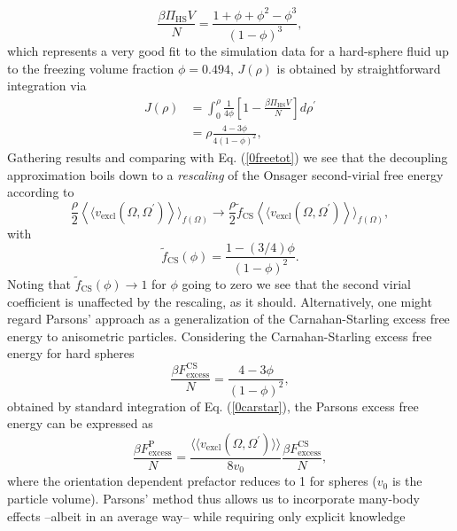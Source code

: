 \documentclass[amssymb]{revtex4}
\begin{document}
\begin{equation}
\frac{\beta \Pi_{\text{HS}} V}{N}=\frac{1+\phi+\phi^{2}-\phi^{3}}{(1-\phi)^{3}},
\label{0carstar}
\end{equation}
which represents a very good fit to the simulation data
for a hard-sphere fluid up to the freezing volume fraction $\phi=0.494$,
$J(\rho)$ is obtained by straightforward integration via
\begin{align}
J(\rho)&=\int_{0}^{\rho}\frac{1}{4\phi}\left[1-\frac{\beta \Pi_{\text{HS}}V}{N}\right]d\rho^{\prime} \nonumber \\
&=\rho \frac{4-3\phi}{4(1-\phi)^{2}},  
\end{align}
Gathering results and comparing with Eq. (\ref{0freetot}) we see that the decoupling approximation 
boils down to a {\em rescaling} of
the Onsager second-virial free energy according to 
\begin{equation}
\frac{\rho}{2}\left \langle\langle v_{\text{excl}}(\Omega,\Omega^{\prime}) \right\rangle\rangle_{f(\Omega)}
\rightarrow \frac{\rho}{2}\tilde{f}_{\text{CS}}\left \langle\langle v_{\text{excl}}(\Omega,\Omega^{\prime}) \right\rangle\rangle
_{f(\Omega)},
\end{equation}
with 
\begin{equation}
\tilde{f} _ {\text{CS}}(\phi)= \frac{1-(3/4)\phi}{(1-\phi)^{2}}. \label{introfcarstar}
\end{equation}
Noting that $\tilde{f}_{\text{CS}}(\phi)\rightarrow 1$ for $\phi$ going to zero we see that 
the second virial
coefficient is unaffected by the rescaling, as it should.
Alternatively, one might regard Parsons' approach  as a 
generalization of the Carnahan-Starling excess free energy  to anisometric particles.
Considering the Carnahan-Starling excess free energy for hard spheres
\begin{equation}
\frac{\beta F_{\text{excess}}^{\text{CS}}}{N}=\frac{4-3\phi}{(1-\phi)^2},
\end{equation}
obtained by standard integration of Eq. (\ref{0carstar}), the Parsons
excess free energy can be expressed as
\begin{equation}
\frac{\beta F_{\text{excess}}^{\text{P}}}{N}=\frac{\langle\langle v_{\text{excl}}(\Omega,\Omega^{\prime})\rangle\rangle }{8 v_{0}}\frac{\beta F_{\text{excess}}^{\text{CS}}}{N},
\label{0rescaleCS}
\end{equation} 
where the orientation dependent prefactor  
reduces to 1 for spheres ($v_{0}$ is the particle volume).
Parsons' method  thus allows us to incorporate many-body
effects --albeit in an average way-- while requiring only explicit knowledge
\end{document}
